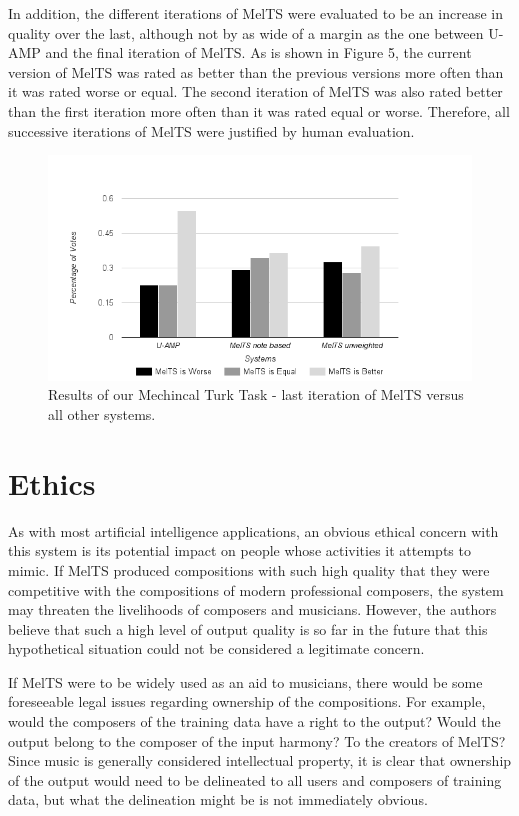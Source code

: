 \documentclass{sig-alternate}
\begin{document}
In addition, the different iterations of MelTS were evaluated to be an increase in quality over the last, although not by as wide of a margin as the one between U-AMP and the final iteration of MelTS. As is shown in Figure 5, the current version of MelTS was rated as better than the previous versions more often than it was rated worse or equal. The second iteration of MelTS was also rated better than the first iteration more often than it was rated equal or worse. Therefore, all successive iterations of MelTS were justified by human evaluation.

\begin{figure}
\includegraphics[scale=0.4]{mturk_results}
\caption{Results of our Mechincal Turk Task - last iteration of MelTS versus all other systems.}
\end{figure}
\label{sec:system_performance}

\section{Ethics}
As with most artificial intelligence applications, an obvious ethical concern with this system is its potential impact on people whose activities it attempts to mimic. If MelTS produced compositions with such high quality that they were competitive with the compositions of modern professional composers, the system may threaten the livelihoods of composers and musicians. However, the authors believe that such a high level of output quality is so far in the future that this hypothetical situation could not be considered a legitimate concern.

If MelTS were to be widely used as an aid to musicians, there would be some foreseeable legal issues regarding ownership of the compositions. For example, would the composers of the training data have a right to the output? Would the output belong to the composer of the input harmony? To the creators of MelTS? Since music is generally considered intellectual property, it is clear that ownership of the output would need to be delineated to all users and composers of training data, but what the delineation might be is not immediately obvious.
\label{sec:ethics}
\end{document}
